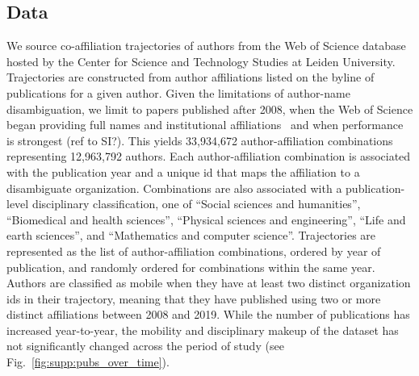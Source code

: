 \documentclass[12pt]{article} %
\begin{document}
\subsection*{Data}
We source co-affiliation trajectories of authors from the Web of Science database hosted by the Center for Science and Technology Studies at Leiden University. 
Trajectories are constructed from author affiliations listed on the byline of publications for a given author.
Given the limitations of author-name disambiguation, we limit to papers published after 2008, when the Web of Science began providing full names and institutional affiliations~\autocite{caron2014disambiguation} and when performance is strongest (ref to SI?). 
This yields 33,934,672 author-affiliation combinations representing 12,963,792 authors. 
Each author-affiliation combination is associated with the publication year and a unique id that maps the affiliation to a disambiguate organization. 
Combinations are also associated with a publication-level disciplinary classification, one of ``Social sciences and humanities'',
``Biomedical and health sciences'', ``Physical sciences and engineering'', ``Life and earth sciences'', and ``Mathematics and computer science''.
Trajectories are represented as the list of author-affiliation combinations, ordered by year of publication, and randomly ordered for combinations within the same year. 
Authors are classified as mobile when they have at least two distinct organization ids in their trajectory, meaning that they have published using two or more distinct affiliations between 2008 and 2019.
While the number of publications has increased year-to-year, the mobility and disciplinary makeup of the dataset has not significantly changed across the period of study (see Fig.~\ref{fig:supp:pubs_over_time}).
\end{document}
